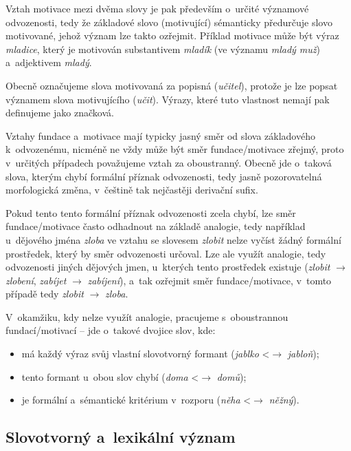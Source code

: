 Vztah motivace mezi dvěma slovy je pak především o~určité významové
odvozenosti, tedy že základové slovo (motivující) sémanticky předurčuje
slovo motivované, jehož význam lze takto ozřejmit.
\parencite[96]{dokulil00} Příklad motivace může být výraz
\emph{mladice}, který je motivován substantivem \emph{mladík} (ve
významu \emph{mladý muž}) a~adjektivem \emph{mladý}.
\parencite[110]{dokulil62}

Obecně označujeme slova motivovaná za popisná (\emph{učitel}), protože
je lze popsat významem slova motivujícího (\emph{učit}). Výrazy, které
tuto vlastnost nemají pak definujeme jako značková.
\parencite[96]{dokulil00}

Vztahy fundace a~motivace mají typicky jasný směr od slova základového
k~odvozenému, nicméně ne vždy může být směr fundace/motivace zřejmý, proto
v~určitých případech považujeme vztah za oboustranný. Obecně jde
o~taková slova, kterým chybí formální příznak odvozenosti, tedy jasně
pozorovatelná morfologická změna, v~češtině tak nejčastěji derivační
sufix.~\parencite[96]{dokulil00}

Pokud tento tento formální příznak odvozenosti zcela chybí, lze směr
fundace/motivace často odhadnout na základě analogie, tedy například
u~dějového jména \emph{zloba} ve vztahu se slovesem \emph{zlobit} nelze
vyčíst žádný formální prostředek, který by směr odvozenosti určoval. Lze
ale využít analogie, tedy odvozenosti jiných dějových jmen, u~kterých
tento prostředek existuje (\emph{zlobit} $\rightarrow$
\emph{zlobení}, \emph{zabíjet} $\rightarrow$ \emph{zabíjení}), a~tak
ozřejmit směr fundace/motivace, v~tomto případě tedy \emph{zlobit}
$\rightarrow$ \emph{zloba}.~\parencite[96]{dokulil00}

V~okamžiku, kdy nelze využít analogie, pracujeme s~oboustrannou
fundací/motivací -- jde o~takové dvojice slov, kde:

\begin{itemize}
\tightlist
\item
  má každý výraz svůj vlastní slovotvorný formant (\emph{jablko}
  \textless{}$\rightarrow$ \emph{jabloň});
\item
  tento formant u~obou slov chybí (\emph{doma}
  \textless{}$\rightarrow$ \emph{domů});
\item
  je formální a~sémantické kritérium v~rozporu (\emph{něha}
  \textless{}$\rightarrow$ \emph{něžný}).~\parencite[96]{dokulil00}
\end{itemize}

\hypertarget{slovotvornuxfd-a-lexikuxe1lnuxed-vuxfdznam}{%
\subsection{Slovotvorný a~lexikální
význam}\label{slovotvornuxfd-a-lexikuxe1lnuxed-vuxfdznam}}


